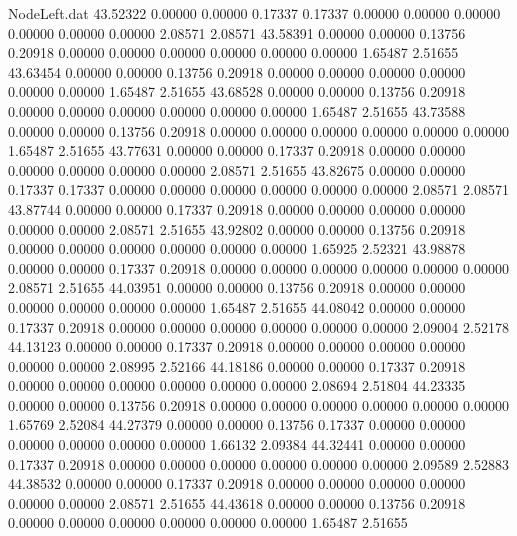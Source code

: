 \begin{filecontents}{NodeLeft.dat}
  43.52322    0.00000    0.00000     0.17337    0.17337    0.00000    0.00000    0.00000    0.00000    0.00000    0.00000    2.08571    2.08571
  43.58391    0.00000    0.00000     0.13756    0.20918    0.00000    0.00000    0.00000    0.00000    0.00000    0.00000    1.65487    2.51655
  43.63454    0.00000    0.00000     0.13756    0.20918    0.00000    0.00000    0.00000    0.00000    0.00000    0.00000    1.65487    2.51655
  43.68528    0.00000    0.00000     0.13756    0.20918    0.00000    0.00000    0.00000    0.00000    0.00000    0.00000    1.65487    2.51655
  43.73588    0.00000    0.00000     0.13756    0.20918    0.00000    0.00000    0.00000    0.00000    0.00000    0.00000    1.65487    2.51655
  43.77631    0.00000    0.00000     0.17337    0.20918    0.00000    0.00000    0.00000    0.00000    0.00000    0.00000    2.08571    2.51655
  43.82675    0.00000    0.00000     0.17337    0.17337    0.00000    0.00000    0.00000    0.00000    0.00000    0.00000    2.08571    2.08571
  43.87744    0.00000    0.00000     0.17337    0.20918    0.00000    0.00000    0.00000    0.00000    0.00000    0.00000    2.08571    2.51655
  43.92802    0.00000    0.00000     0.13756    0.20918    0.00000    0.00000    0.00000    0.00000    0.00000    0.00000    1.65925    2.52321
  43.98878    0.00000    0.00000     0.17337    0.20918    0.00000    0.00000    0.00000    0.00000    0.00000    0.00000    2.08571    2.51655
  44.03951    0.00000    0.00000     0.13756    0.20918    0.00000    0.00000    0.00000    0.00000    0.00000    0.00000    1.65487    2.51655
  44.08042    0.00000    0.00000     0.17337    0.20918    0.00000    0.00000    0.00000    0.00000    0.00000    0.00000    2.09004    2.52178
  44.13123    0.00000    0.00000     0.17337    0.20918    0.00000    0.00000    0.00000    0.00000    0.00000    0.00000    2.08995    2.52166
  44.18186    0.00000    0.00000     0.17337    0.20918    0.00000    0.00000    0.00000    0.00000    0.00000    0.00000    2.08694    2.51804
  44.23335    0.00000    0.00000     0.13756    0.20918    0.00000    0.00000    0.00000    0.00000    0.00000    0.00000    1.65769    2.52084
  44.27379    0.00000    0.00000     0.13756    0.17337    0.00000    0.00000    0.00000    0.00000    0.00000    0.00000    1.66132    2.09384
  44.32441    0.00000    0.00000     0.17337    0.20918    0.00000    0.00000    0.00000    0.00000    0.00000    0.00000    2.09589    2.52883
  44.38532    0.00000    0.00000     0.17337    0.20918    0.00000    0.00000    0.00000    0.00000    0.00000    0.00000    2.08571    2.51655
  44.43618    0.00000    0.00000     0.13756    0.20918    0.00000    0.00000    0.00000    0.00000    0.00000    0.00000    1.65487    2.51655

\end{filecontents}
